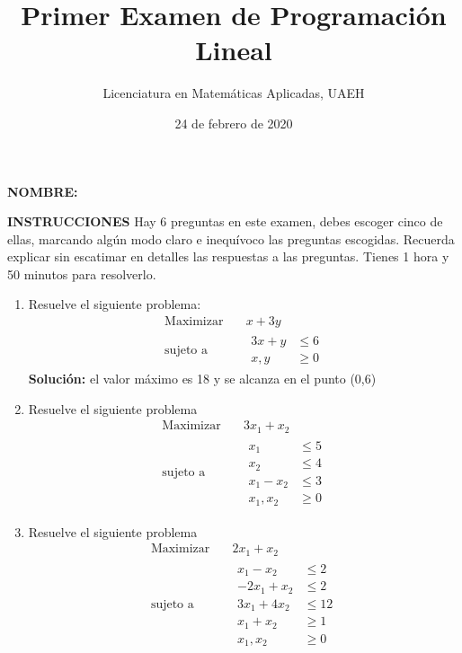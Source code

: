 \documentclass[twocolumn]{article}
\author{Licenciatura en Matemáticas Aplicadas, UAEH}
\date{24 de febrero de 2020}
\title{Primer Examen de Programación Lineal}
\begin{document}
\maketitle
\thispagestyle{empty}

\textbf{NOMBRE:}
\hrulefill

\medskip

\textbf{INSTRUCCIONES} Hay 6 preguntas en este examen, debes escoger cinco
de ellas, marcando algún modo claro e inequívoco las preguntas
escogidas. Recuerda explicar sin escatimar en detalles las respuestas
a las preguntas. Tienes 1 hora y 50 minutos para resolverlo.

\begin{enumerate}
\item Resuelve el siguiente problema:
\begin{equation*}
\begin{aligned}
\text{Maximizar} \quad & x+3y\\
\text{sujeto a} \quad &
  \begin{aligned}
   3x+y &\leq 6\\
   x,y &\geq  0
  \end{aligned}
\end{aligned}
\end{equation*}
\textbf{Solución:} el valor máximo es 18 y se alcanza en el punto (0,6)

\item Resuelve el siguiente problema 
\begin{equation*}
 \begin{aligned}
\text{Maximizar} \quad & 3x_{1}+x_{2}\\
\text{sujeto a} \quad &
  \begin{aligned}
   x_{1} &\leq 5\\
   x_{2} &\leq 4\\
   x_{1}-x_{2} &\leq 3\\
    x_{1},x_{2} &\geq 0
  \end{aligned}
\end{aligned}
\end{equation*}

\item Resuelve el siguiente problema 
\begin{equation*}
 \begin{aligned}
\text{Maximizar} \quad & 2x_{1}+x_{2}\\
\text{sujeto a} \quad &
  \begin{aligned}
   x_{1}-x_{2} &\leq 2\\
   -2x_{1}+x_{2} &\leq 2\\
   3x_{1}+4x_{2} &\leq 12\\
   x_{1}+x_{2} &\geq 1\\
    x_{1},x_{2} &\geq 0
  \end{aligned}
\end{aligned}
\end{equation*}


\end{enumerate}
\end{document}
